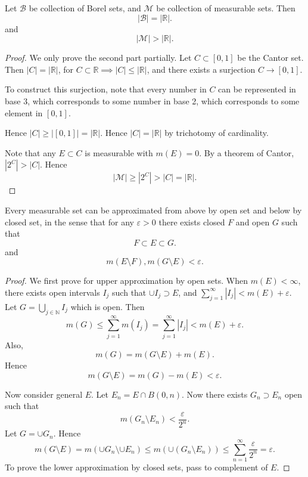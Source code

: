 
\begin{theorem}
	Let $\mathcal{B}$ be collection of Borel sets, and $\mathcal{M}$ be collection of measurable sets. Then
	\[
		|\mathcal{B}| = |\mathbb{R}|
	.\] 
	and
	\[
		|\mathcal{M}| > |\mathbb{R}|
	.\] 
\end{theorem}
\begin{proof}
	We only prove the second part partially. Let $C \subset [0,1]$ be the Cantor set. Then $|C| = |\mathbb{R}|$, for $C \subset \mathbb{R} \implies |C| \le |\mathbb{R}|$, and there exists a surjection $C \to [0,1]$.

	To construct this surjection, note that every number in $C$ can be represented in base 3, which corresponds to some number in base 2, which corresponds to some element in $[0,1]$.

	Hence $|C| \ge |[0,1]| = |\mathbb{R}|$. Hence $|C| = |\mathbb{R}|$ by trichotomy of cardinality.

	Note that any  $E \subset C$ is measurable with $m(E) = 0$. By a theorem of Cantor, $|2^C| > |C|$. Hence
	 \[
		|\mathcal{M}| \ge |2^C| > |C| = |\mathbb{R}|
	.\] 
\end{proof}

\begin{theorem}
	Every measurable set can be approximated from above by open set and below by closed set, in the sense that for any $\varepsilon>0$ there exists closed $F$ and open $G$ such that
	\[
		F \subset E \subset G
	.\] 
	and
	\[
		m(E\setminus F), m(G \setminus E) < \varepsilon
	.\] 
\end{theorem}
\begin{proof}
	We first prove for upper approximation by open sets. 
	When $m(E) < \infty $, there exists open intervals $I_j$ such that $\cup I_j \supset E$, and $\sum_{j=1}^{\infty} |I_j| < m(E) + \varepsilon$. Let $G = \bigcup_{j \in \mathbb{N}} I_j$ which is open. Then
	\[
		m(G) \le \sum_{j=1}^{\infty} m(I_j) = \sum_{j=1}^{\infty} |I_j| < m(E) + \varepsilon
	.\] 
	Also,
	\[
		m(G) = m(G \setminus E) + m(E)
	.\] 
	Hence
	\[
		m(G \setminus E) = m(G) - m(E) < \varepsilon
	.\] 

	Now consider general $E$. Let $E_n = E \cap B\left( 0 , n\right) $. Now there exists $G_n \supset E_n$ open such that
	\[
		m(G_n \setminus E_n) < \frac{\varepsilon}{2^n}
	.\] 
	Let $G = \cup G_n$. Hence
	\[
		m(G \setminus E) = m\left( \cup G_n \setminus \cup  E_n \right) \le m\left( \cup (G_n \setminus E_n) \right) \le \sum_{n=1}^{\infty} \frac{\varepsilon}{2^n} =\varepsilon
	.\] 
	To prove the lower approximation by closed sets, pass to complement of $E$.
\end{proof}

